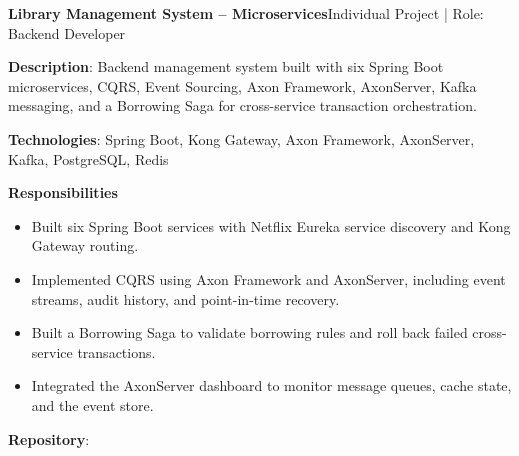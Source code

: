   \resumeProjectHeading
    {\textbf{Library Management System -- Microservices}}{Individual Project | Role: Backend Developer}
    \resumeItemListStart
      \item \textbf{Description}: Backend management system built with six Spring Boot microservices, CQRS, Event Sourcing, Axon Framework, AxonServer, Kafka messaging, and a Borrowing Saga for cross-service transaction orchestration.
      \item \textbf{Technologies}: Spring Boot, Kong Gateway, Axon Framework, AxonServer, Kafka, PostgreSQL, Redis
      \item \textbf{Responsibilities}
        \begin{itemize}
          \item Built six Spring Boot services with Netflix Eureka service discovery and Kong Gateway routing.
          \item Implemented CQRS using Axon Framework and AxonServer, including event streams, audit history, and point-in-time recovery.
          \item Built a Borrowing Saga to validate borrowing rules and roll back failed cross-service transactions.
          \item Integrated the AxonServer dashboard to monitor message queues, cache state, and the event store.
        \end{itemize}
      \item \textbf{Repository}: \href{https://github.com/nvminh162/backend-library-system}{}
    \resumeItemListEnd

\resumeSubHeadingListEnd
